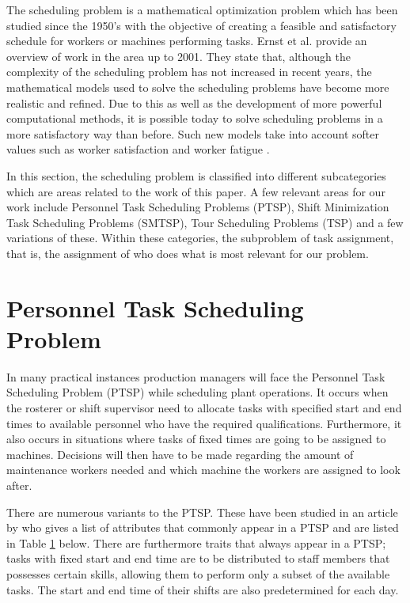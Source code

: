 
The scheduling problem is a mathematical optimization problem which has been studied since the 1950's with the objective of creating a feasible and satisfactory schedule for workers or machines performing tasks. Ernst et al. provide an overview of work in the area up to 2001. They state that, although the complexity of the scheduling problem has not increased in recent years, the mathematical models used to solve the scheduling problems have become more realistic and refined. Due to this as well as the development of more powerful computational methods, it is possible today to solve scheduling problems in a more satisfactory way than before. Such new models take into account softer values such as worker satisfaction and worker fatigue \cite{Ernst_2004}.

In this section, the scheduling problem is classified into different subcategories which are areas related to the work of this paper. A few relevant areas for our work include Personnel Task Scheduling Problems (PTSP), Shift Minimization Task Scheduling Problems (SMTSP), Tour Scheduling Problems (TSP) and a few variations of these. Within these categories, the subproblem of task assignment, that is, the assignment of who does what is most relevant for our problem.



\section{Personnel Task Scheduling Problem} \label{PTSP}

In many practical instances production managers will face the Personnel Task Scheduling Problem (PTSP) while scheduling plant operations. It occurs when the rosterer or shift supervisor need to allocate tasks with specified start and end times to available personnel who have the required qualifications. Furthermore, it also occurs in situations where tasks of fixed times are going to be assigned to machines. Decisions will then have to be made regarding the amount of maintenance workers needed and which machine the workers are assigned to look after. \cite{krishnamoorthy_2001}

There are numerous variants to the PTSP. These have been studied in an article by \cite{krishnamoorthy_2001} who gives a list of attributes that commonly appear in a PTSP and are listed in Table \ref{PTSP} below. There are furthermore traits that always appear in a PTSP; tasks with fixed start and end time are to be distributed to staff members that possesses certain skills, allowing them to perform only a subset of the available tasks. The start and end time of their shifts are also predetermined for each day.

